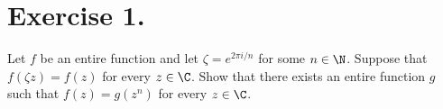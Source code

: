 \section*{Exercise 1.}

Let $f$ be an entire function and let $\zeta = e^{2\pi i / n}$ for some $n \in \N$. Suppose that $f(\zeta z) = f(z)$ for every $z \in\C$. Show that there exists an entire function $g$ such that $f(z) = g(z^n)$ for every $z\in \C$.